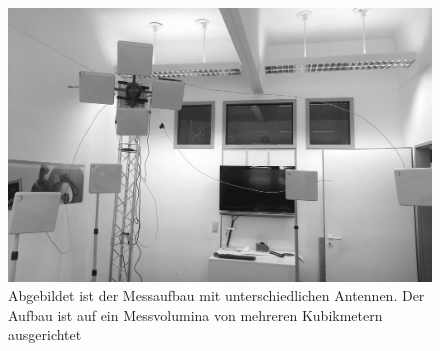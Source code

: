 %
\begin{figure}[h]
         \centering
         \caption[Messaufbau der Amedo GmbH]{Abgebildet ist der Messaufbau mit unterschiedlichen Antennen. Der Aufbau ist auf ein Messvolumina von mehreren Kubikmetern ausgerichtet}
		\label{fig:Setup}
		\vspace{2mm}
         \includegraphics[width=\textwidth]{img/RFID-Okto.png}
         
\end{figure}